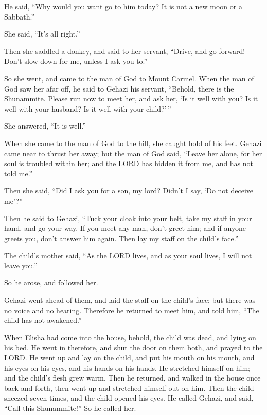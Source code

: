  He said, ``Why would you want go to him today? It is not
a new moon or a Sabbath.''

She said, ``It's all right.''

 Then she saddled a donkey, and said to her servant,
``Drive, and go forward! Don't slow down for me, unless I ask you to.''

 So she went, and came to the man of God to Mount Carmel.
When the man of God saw her afar off, he said to Gehazi his servant,
``Behold, there is the Shunammite.  Please run now to
meet her, and ask her, `Is it well with you? Is it well with your
husband? Is it well with your child?'\,''

She answered, ``It is well.''

 When she came to the man of God to the hill, she caught
hold of his feet. Gehazi came near to thrust her away; but the man of
God said, ``Leave her alone, for her soul is troubled within her; and
the LORD has hidden it from me, and has not told me.''

 Then she said, ``Did I ask you for a son, my lord?
Didn't I say, `Do not deceive me'?''

 Then he said to Gehazi, ``Tuck your cloak into your
belt, take my staff in your hand, and go your way. If you meet any man,
don't greet him; and if anyone greets you, don't answer him again. Then
lay my staff on the child's face.''

 The child's mother said, ``As the LORD lives, and as
your soul lives, I will not leave you.''

So he arose, and followed her.

 Gehazi went ahead of them, and laid the staff on the
child's face; but there was no voice and no hearing. Therefore he
returned to meet him, and told him, ``The child has not awakened.''

 When Elisha had come into the house, behold, the child
was dead, and lying on his bed.  He went in therefore,
and shut the door on them both, and prayed to the LORD. 
He went up and lay on the child, and put his mouth on his mouth, and his
eyes on his eyes, and his hands on his hands. He stretched himself on
him; and the child's flesh grew warm.  Then he returned,
and walked in the house once back and forth, then went up and stretched
himself out on him. Then the child sneezed seven times, and the child
opened his eyes.  He called Gehazi, and said, ``Call this
Shunammite!'' So he called her.

